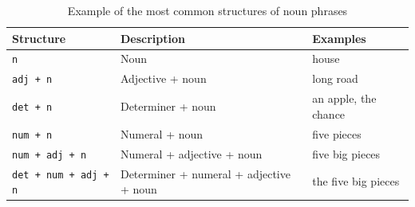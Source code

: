 \documentclass[11pt]{article}
\begin{document}
\begin{table}
  \centering
  \begin{tabular}{|l|l|l|}
  \hline
  \textbf{Structure} & \textbf{Description} & \textbf{Examples} \\
  \hline
  \texttt{n} & Noun & house \\
  \texttt{adj + n} & Adjective + noun & long road \\
  \texttt{det + n} & Determiner + noun & an apple, the chance \\
  \texttt{num + n} & Numeral + noun & five pieces \\
  \texttt{num + adj + n} & Numeral + adjective + noun & five big pieces \\
  \texttt{det + num + adj + n} & Determiner + numeral + adjective + noun & the five big pieces \\
  \hline
  \end{tabular}
  \caption{Example of the most common structures of noun phrases}
  \label{table:nps}
\end{table}
\end{document}
